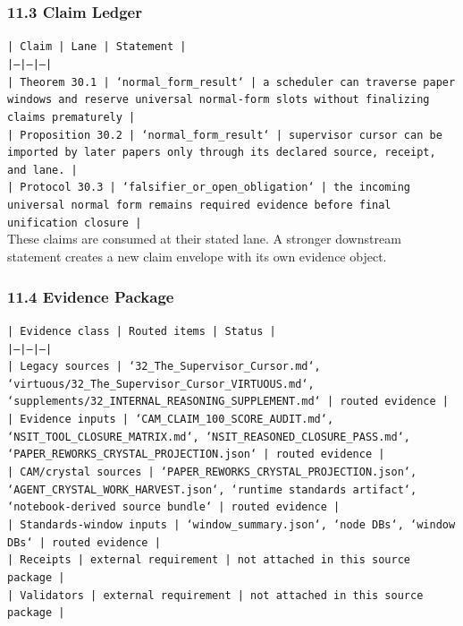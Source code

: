 \documentclass[11pt]{article}
\begin{document}
\subsubsection*{11.3 Claim Ledger}

\noindent\texttt{| Claim | Lane | Statement |}\\
\noindent\texttt{|---|---|---|}\\
\noindent\texttt{| Theorem 30.1 | `normal\_form\_result` | a scheduler can traverse paper windows and reserve universal normal-form slots without finalizing claims prematurely |}\\
\noindent\texttt{| Proposition 30.2 | `normal\_form\_result` | supervisor cursor can be imported by later papers only through its declared source, receipt, and lane. |}\\
\noindent\texttt{| Protocol 30.3 | `falsifier\_or\_open\_obligation` | the incoming universal normal form remains required evidence before final unification closure |}\\

These claims are consumed at their stated lane. A stronger downstream statement
creates a new claim envelope with its own evidence object.

\subsubsection*{11.4 Evidence Package}

\noindent\texttt{| Evidence class | Routed items | Status |}\\
\noindent\texttt{|---|---|---|}\\
\noindent\texttt{| Legacy sources | `32\_The\_Supervisor\_Cursor.md`, `virtuous/32\_The\_Supervisor\_Cursor\_VIRTUOUS.md`, `supplements/32\_INTERNAL\_REASONING\_SUPPLEMENT.md` | routed evidence |}\\
\noindent\texttt{| Evidence inputs | `CAM\_CLAIM\_100\_SCORE\_AUDIT.md`, `NSIT\_TOOL\_CLOSURE\_MATRIX.md`, `NSIT\_REASONED\_CLOSURE\_PASS.md`, `PAPER\_REWORKS\_CRYSTAL\_PROJECTION.json` | routed evidence |}\\
\noindent\texttt{| CAM/crystal sources | `PAPER\_REWORKS\_CRYSTAL\_PROJECTION.json`, `AGENT\_CRYSTAL\_WORK\_HARVEST.json`, `runtime standards artifact`, `notebook-derived source bundle` | routed evidence |}\\
\noindent\texttt{| Standards-window inputs | `window\_summary.json`, `node DBs`, `window DBs` | routed evidence |}\\
\noindent\texttt{| Receipts | external requirement | not attached in this source package |}\\
\noindent\texttt{| Validators | external requirement | not attached in this source package |}\\
\end{document}
